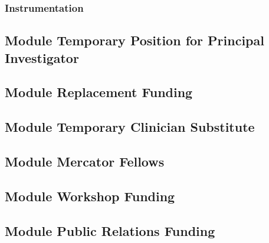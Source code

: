 \documentclass{scrartcl}
\begin{document}
\subsubsection{Instrumentation}



\subsection{Module Temporary Position for Principal Investigator}

\subsection{Module Replacement Funding}

\subsection{Module Temporary Clinician Substitute}

\subsection{Module Mercator Fellows}

\subsection{Module Workshop Funding}

\subsection{Module Public Relations Funding}
\end{document}
